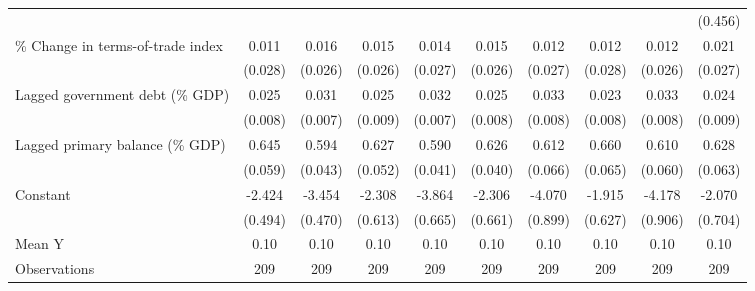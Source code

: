 {\begin{tabular}{l*{9}{c}}
                    &                     &                     &                     &                     &                     &                     &                     &                     &     (0.456)         \\
\addlinespace
\% Change in terms-of-trade index&       0.011         &       0.016         &       0.015         &       0.014         &       0.015         &       0.012         &       0.012         &       0.012         &       0.021         \\
                    &     (0.028)         &     (0.026)         &     (0.026)         &     (0.027)         &     (0.026)         &     (0.027)         &     (0.028)         &     (0.026)         &     (0.027)         \\
\addlinespace
Lagged government debt (\% GDP)&       0.025\sym{**} &       0.031\sym{***}&       0.025\sym{**} &       0.032\sym{***}&       0.025\sym{**} &       0.033\sym{***}&       0.023\sym{**} &       0.033\sym{***}&       0.024\sym{**} \\
                    &     (0.008)         &     (0.007)         &     (0.009)         &     (0.007)         &     (0.008)         &     (0.008)         &     (0.008)         &     (0.008)         &     (0.009)         \\
\addlinespace
Lagged primary balance (\% GDP)&       0.645\sym{***}&       0.594\sym{***}&       0.627\sym{***}&       0.590\sym{***}&       0.626\sym{***}&       0.612\sym{***}&       0.660\sym{***}&       0.610\sym{***}&       0.628\sym{***}\\
                    &     (0.059)         &     (0.043)         &     (0.052)         &     (0.041)         &     (0.040)         &     (0.066)         &     (0.065)         &     (0.060)         &     (0.063)         \\
\addlinespace
Constant            &      -2.424\sym{***}&      -3.454\sym{***}&      -2.308\sym{***}&      -3.864\sym{***}&      -2.306\sym{***}&      -4.070\sym{***}&      -1.915\sym{**} &      -4.178\sym{***}&      -2.070\sym{**} \\
                    &     (0.494)         &     (0.470)         &     (0.613)         &     (0.665)         &     (0.661)         &     (0.899)         &     (0.627)         &     (0.906)         &     (0.704)         \\
\midrule
Mean Y              &        0.10         &        0.10         &        0.10         &        0.10         &        0.10         &        0.10         &        0.10         &        0.10         &        0.10         \\
Observations        &         209         &         209         &         209         &         209         &         209         &         209         &         209         &         209         &         209         \\
\bottomrule
\end{tabular}
}

